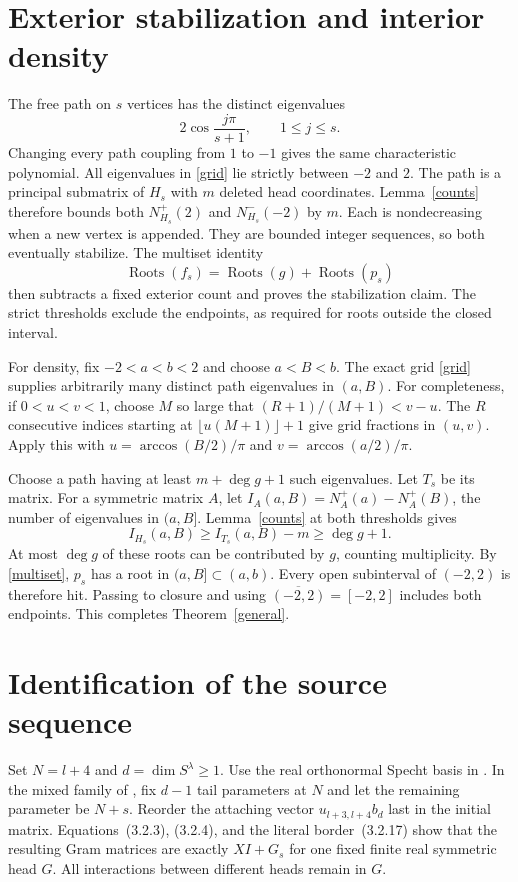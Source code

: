 \documentclass[11pt]{article}
\newcommand{\roots}{\operatorname{Roots}}
\begin{document}
\section{Exterior stabilization and interior density}
The free path on $s$ vertices has the distinct eigenvalues
\begin{equation}\label{grid}
 2\cos\frac{j\pi}{s+1},\qquad 1\le j\le s.
\end{equation}
Changing every path coupling from $1$ to $-1$ gives the same characteristic
polynomial. All eigenvalues in \eqref{grid} lie strictly between $-2$ and $2$.
The path is a principal submatrix of $H_s$ with $m$ deleted head coordinates.
Lemma~\ref{counts} therefore bounds both $N_{H_s}^+(2)$ and
$N_{H_s}^-(-2)$ by $m$. Each is nondecreasing when a new vertex is appended.
They are bounded integer sequences, so both eventually stabilize.
The multiset identity
\begin{equation}\label{multiset}
 \roots(f_s)=\roots(g)+\roots(p_s)
\end{equation}
then subtracts a fixed exterior count and proves the stabilization claim.
The strict thresholds exclude the endpoints, as required for roots outside
the closed interval.

For density, fix $-2<a<b<2$ and choose $a<B<b$. The exact grid
\eqref{grid} supplies arbitrarily many distinct path eigenvalues in $(a,B)$.
For completeness, if $0<u<v<1$, choose $M$ so large that
$(R+1)/(M+1)<v-u$. The $R$ consecutive indices starting at
$\lfloor u(M+1)\rfloor+1$ give grid fractions in $(u,v)$.
Apply this with
$u=\arccos(B/2)/\pi$ and $v=\arccos(a/2)/\pi$.

Choose a path having at least $m+\deg g+1$ such eigenvalues. Let $T_s$ be its
matrix. For a symmetric matrix $A$, let
$I_A(a,B)=N_A^+(a)-N_A^+(B)$, the number of eigenvalues in $(a,B]$.
Lemma~\ref{counts} at both thresholds gives
\begin{equation}\label{interval}
 I_{H_s}(a,B)\ge I_{T_s}(a,B)-m\ge\deg g+1.
\end{equation}
At most $\deg g$ of these roots can be contributed by $g$, counting
multiplicity. By \eqref{multiset}, $p_s$ has a root in $(a,B]\subset(a,b)$.
Every open subinterval of $(-2,2)$ is therefore hit. Passing to closure and
using $\overline{(-2,2)}=[-2,2]$ includes both endpoints. This completes
Theorem~\ref{general}.

\section{Identification of the source sequence}\label{application}
Set $N=l+4$ and $d=\dim S^\lambda\ge1$. Use the real orthonormal Specht
basis in \cite[Section~3.2.3]{MM}. In the mixed family of \cite[(3.17)]{MM},
fix $d-1$ tail parameters at $N$ and let the remaining parameter be $N+s$.
Reorder the attaching vector $u_{l+3,l+4}b_d$ last in the initial matrix.
Equations~(3.2.3), (3.2.4), and the literal border~(3.2.17) show that the
resulting Gram matrices are exactly $XI+G_s$ for one fixed finite real
symmetric head $G$. All interactions between different heads remain in $G$.
\end{document}
